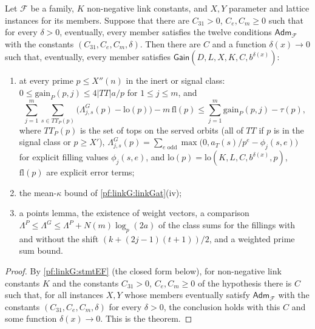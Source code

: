 \begin{theorem}\label{pf:linkG:stmtF}
Let $\mathcal F$ be a family, $K$ non-negative link constants, and $X,Y$ parameter and lattice instances for its
members. Suppose that there are $C_{31}>0$, $C_e,C_m\ge0$ such that for every $\delta>0$, eventually, every member
satisfies the twelve conditions $\mathsf{Adm}_{\mathcal F}$ with the constants $(C_{31},C_e,C_m,\delta)$. Then there are $C$ and a
function $\delta(x)\to0$ such that, eventually, every member satisfies $\mathsf{Gain}(D,L,X,K,C,b^{\delta(x)})$:
\begin{enumerate}[label=(\alph*)]
\item at every prime $p\le X''(n)$ in the inert or signal class: $0\le\mathrm{gain}_P(p,j)\le4|TT|a/p$ for $1\le j\le
m$, and
\begin{equation}\label{eq:pf:linkG:conc1}
\sum_{j=1}^m\sum_{s\in TT_P(p)}\bigl(\Lambda^{G}_{j,s}(p)-\mathrm{lo}(p)\bigr)-m\,\mathrm{fl}(p)\le
\sum_{j=1}^m\mathrm{gain}_P(p,j)-\tau(p),
\end{equation}
where $TT_P(p)$ is the set of tops on the served orbits (all of $TT$ if $p$ is in the signal class or $p\ge X'$),
$\Lambda^G_{j,s}(p)=\sum_{e\text{ odd}}\max\bigl(0,a_T(s)/p^e-\phi_{j}(s,e)\bigr)$ for explicit filling values
$\phi_j(s,e)$, and $\mathrm{lo}(p)=\mathrm{lo}(K,L,C,b^{\delta(x)},p)$, $\mathrm{fl}(p)$ are explicit error terms;
\item the mean-$\kappa$ bound of \cref{pf:linkG:linkGat}(iv);
\item a points lemma, the existence of weight vectors, a comparison $\Lambda^P\le\Lambda^G\le\Lambda^P+N(m)\log_p(2a)$
of the class sums for the fillings with and without the shift $(k+(2j-1)(t+1))/2$, and a weighted prime sum bound.
\end{enumerate}
\end{theorem}

\begin{proof}
By \cref{pf:linkG:stmtEF} (the closed form below), for non-negative link constants $K$ and the constants
$C_{31}>0$, $C_e,C_m\ge0$ of the hypothesis there is $C$ such that, for all instances $X,Y$ whose members eventually satisfy
$\mathsf{Adm}_{\mathcal F}$ with the constants $(C_{31},C_e,C_m,\delta)$ for every $\delta>0$, the conclusion holds with this $C$
and some function $\delta(x)\to0$. This is the theorem.
\end{proof}

